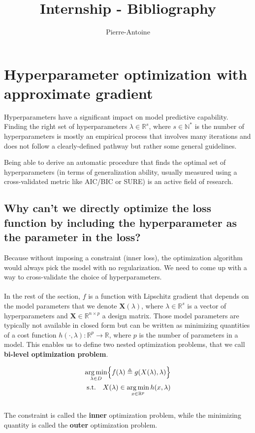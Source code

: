 \documentclass[a4paper,10pt]{article}
\author{Pierre-Antoine}
\title{Internship - Bibliography}
\theoremstyle{definition}
\begin{document}
\maketitle

\vskip 0.3in

\section{Hyperparameter optimization with approximate gradient}

Hyperparameters have a significant impact on model predictive capability. Finding the right set
of hyperparameters $\lambda \in \mathbb{R}^s$, where $s \in \mathbb{N}^*$ is the number of hyperparameters
is mostly an empirical process that involves many iterations and does not follow a clearly-defined pathway
but rather some general guidelines.

Being able to derive an automatic procedure that finds the optimal set of hyperparameters (in terms of generalization
ability, usually measured using a cross-validated metric like AIC/BIC or SURE) is an active field of research.

\subsection*{Why can't we directly optimize the loss function by including the hyperparameter as the parameter in the loss?}

Because without imposing a constraint (inner loss), the optimization algorithm would always pick the model with no regularization.
We need to come up with a way to cross-validate the choice of hyperparameters.
\\
\\
In the rest of the section, $f$ is a function with Lipschitz gradient that depends on the model
parameters that we denote $\mathbf{X}(\lambda)$, where $\lambda \in \mathbb{R}^s$ is a vector of hyperparameters and $\mathbf{X} \in \mathbb{R}^{n\times p}$ a design matrix.
Those model parameters are typically not available in closed form but can be written as minimizing quantities of a cost function $h(\cdot, \lambda) : \mathbb{R}^p \rightarrow \mathbb{R}$,
where $p$ is the number of parameters in a model. This enables us to define two nested optimization problems, that we call
\textbf{bi-level optimization problem}.

\begin{align*}
    \operatorname*{arg\,min}_{\lambda \in D} \Bigl\{ f(\lambda) \triangleq g(X(\lambda), \lambda) \Bigr\} \\
    \text{s.t.} \quad X(\lambda) \in \operatorname*{arg\,min}_{x \in \mathbb{R}^p} h(x, \lambda)
\end{align*}
\\
The constraint is called the \textbf{inner} optimization problem, while the minimizing quantity is called the \textbf{outer} optimization problem.
\end{document}

